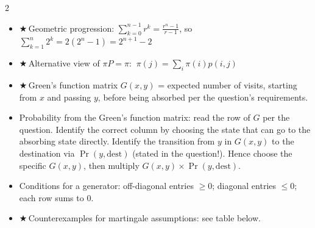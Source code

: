 \documentclass[8pt,letterpaper]{extarticle}
\newcommand{\cs}{{\color{red!75!black}$\bigstar$}\,} %
\begin{document}
\begin{multicols}{2}
\begin{itemize}
  \item \cs Geometric progression: $\sum_{k=0}^{n-1}r^k=\frac{r^n-1}{r-1}$, so $\sum_{k=1}^{n}2^k=2(2^n-1)=2^{n+1}-2$
  \item \cs Alternative view of $\pi P=\pi$: $\ \pi(j)=\sum_i \pi(i)p(i,j)$
  \item \cs Green's function matrix $G(x,y)$ = expected number of visits, starting from $x$ and passing $y$, before being absorbed per the question's requirements.
  \item Probability from the Green's function matrix: read the row of $G$ per the question. Identify the correct column by choosing the state that can go to the absorbing state directly. Identify the transition from $y$ in $G(x,y)$ to the destination via $\Pr(y,\text{dest})$ (stated in the question!). Hence choose the specific $G(x,y)$, then multiply $G(x,y)\times\Pr(y,\text{dest})$.
  \item Conditions for a generator: off-diagonal entries $\ge 0$; diagonal entries $\le 0$; each row sums to $0$.
  \item \cs Counterexamples for martingale assumptions: see table below.
\end{itemize}

\end{multicols}
\end{document}
